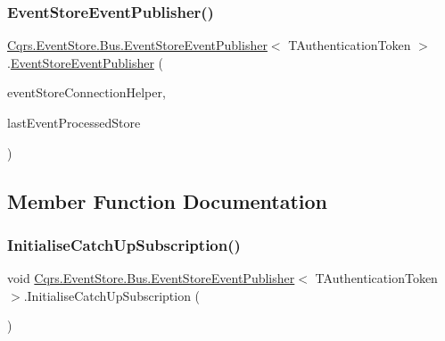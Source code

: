 \subsubsection{\texorpdfstring{Event\+Store\+Event\+Publisher()}{EventStoreEventPublisher()}}
{\footnotesize\ttfamily \hyperlink{classCqrs_1_1EventStore_1_1Bus_1_1EventStoreEventPublisher}{Cqrs.\+Event\+Store.\+Bus.\+Event\+Store\+Event\+Publisher}$<$ T\+Authentication\+Token $>$.\hyperlink{classCqrs_1_1EventStore_1_1Bus_1_1EventStoreEventPublisher}{Event\+Store\+Event\+Publisher} (\begin{DoxyParamCaption}\item[{\hyperlink{interfaceCqrs_1_1EventStore_1_1IEventStoreConnectionHelper}{I\+Event\+Store\+Connection\+Helper}}]{event\+Store\+Connection\+Helper,  }\item[{\hyperlink{interfaceCqrs_1_1Bus_1_1IStoreLastEventProcessed}{I\+Store\+Last\+Event\+Processed}}]{last\+Event\+Processed\+Store }\end{DoxyParamCaption})}



\subsection{Member Function Documentation}
\mbox{\label{classCqrs_1_1EventStore_1_1Bus_1_1EventStoreEventPublisher_a145dd61678031747b4c1768e68937181_a145dd61678031747b4c1768e68937181}} 
\subsubsection{\texorpdfstring{Initialise\+Catch\+Up\+Subscription()}{InitialiseCatchUpSubscription()}}
{\footnotesize\ttfamily void \hyperlink{classCqrs_1_1EventStore_1_1Bus_1_1EventStoreEventPublisher}{Cqrs.\+Event\+Store.\+Bus.\+Event\+Store\+Event\+Publisher}$<$ T\+Authentication\+Token $>$.Initialise\+Catch\+Up\+Subscription (\begin{DoxyParamCaption}{ }\end{DoxyParamCaption})\hspace{0.3cm}{\ttfamily [protected]}}

